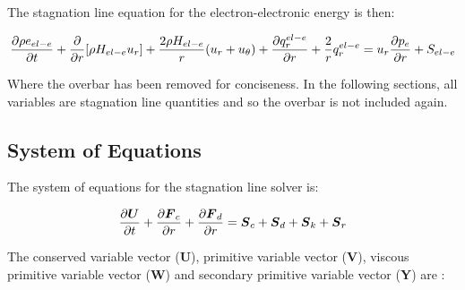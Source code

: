 \documentclass[10pt]{article}
\begin{document}
\begin{flushleft}
The stagnation line equation for the electron-electronic energy is then:

\begin{equation}
    \frac{\partial \rho e_{el-e}}{\partial t} + \frac{\partial }{\partial r}[\rho H_{el-e} u_r] + \frac{2 \rho H_{el-e}}{r} (u_r + u_\theta) + \frac{\partial q_r^{el-e}}{\partial r} + \frac{2}{r} q_r^{el-e} = u_r \frac{\partial p_e}{\partial r} + S_{el-e}
\end{equation}

Where the overbar has been removed for conciseness. In the following sections, all variables are stagnation line quantities and so the overbar is not included again.

\subsection{System of Equations}

The system of equations for the stagnation line solver is:

\begin{equation}
    \frac{\partial \boldsymbol{U}}{\partial t} + \frac{\partial \boldsymbol{F}_c}{\partial r} + \frac{\partial \boldsymbol{F}_d}{\partial r} = \boldsymbol{S}_c + \boldsymbol{S}_d + \boldsymbol{S}_k + \boldsymbol{S}_r
\end{equation}


The conserved variable vector (\textbf{U}), primitive variable vector (\textbf{V}), viscous primitive variable vector (\textbf{W}) and secondary primitive variable vector (\textbf{Y}) are :


\end{flushleft}
\end{document}

